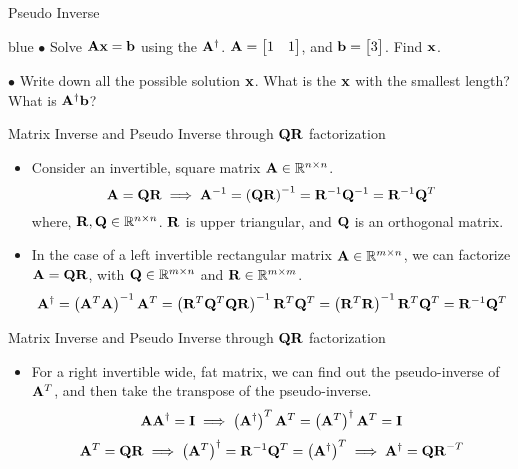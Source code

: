 \documentclass[aspectratio=169]{beamer}
\let\olditem\item
\renewcommand{\item}{\setlength{\itemsep}{\fill}\olditem}
\def\mf{\ensuremath\mathbf}
\def\mb{\ensuremath\mathbb}
\begin{document}
\begin{frame}[t]{Pseudo Inverse}
\begin{color}{blue}
    $\bullet$ Solve $\mf{Ax} = \mf{b}$ using the $\mf{A}^\dagger$. $\mf{A} = \begin{bmatrix*}[r]1 & 1\end{bmatrix*}$, and $\mf{b} = \begin{bmatrix*}3\end{bmatrix*}$. Find $\mf{x}$.\\
    \vspace{2cm}

    $\bullet$ Write down all the possible solution $\mf{x}$. What is the $\mf{x}$ with the smallest length? What is $\mf{A}^\dagger \mf{b}$?
\end{color}
\end{frame}


\begin{frame}[t]{Matrix Inverse and Pseudo Inverse through $\mf{QR}$ factorization}
\begin{itemize}
    \item Consider an invertible, square matrix $\mf{A} \in \mb{R}^{n \times n}$. 
    \[ \mf{A} = \mf{QR} \implies \mf{A}^{-1} = \left(\mf{QR}\right)^{-1} = \mf{R}^{-1}\mf{Q}^{-1} = \mf{R}^{-1}\mf{Q}^T \] 
    where, $\mf{R}, \mf{Q} \in \mb{R}^{n \times n}$. $\mf{R}$ is upper triangular, and $\mf{Q}$ is an orthogonal matrix.
    
    \item In the case of a left invertible rectangular matrix $\mf{A} \in \mb{R}^{m \times n}$, we can factorize $\mf{A} = \mf{QR}$, with $\mf{Q} \in \mb{R}^{m \times n}$ and $\mf{R} \in \mb{R}^{m \times m}$.
    \[ \mf{A}^{\dagger} = \left(\mf{A}^T\mf{A}\right)^{-1}\mf{A}^T = \left(\mf{R}^T\mf{Q}^T\mf{QR}\right)^{-1}\mf{R}^T\mf{Q}^T = \left(\mf{R}^T\mf{R}\right)^{-1}\mf{R}^T\mf{Q}^T = \mf{R}^{-1}\mf{Q}^T \]
\end{itemize}
\end{frame}



\begin{frame}[t]{Matrix Inverse and Pseudo Inverse through $\mf{QR}$ factorization}
\begin{itemize}
    \item For a right invertible wide, fat matrix, we can find out the pseudo-inverse of $\mf{A}^T$, and then take the transpose of the pseudo-inverse.
    \[ \mf{AA}^{\dagger} = \mf{I} \implies \left(\mf{A}^{\dagger}\right)^T\mf{A}^T = \left(\mf{A}^T\right)^{\dagger}\mf{A}^T = \mf{I} \]
    \[ \mf{A}^T = \mf{QR} \implies \left(\mf{A}^T\right)^{\dagger} = \mf{R}^{-1}\mf{Q}^T = \left(\mf{A}^{\dagger}\right)^T \implies  \mf{A}^{\dagger} = \mf{QR}^{-T} \]
\end{itemize}
\end{frame}
\end{document}
